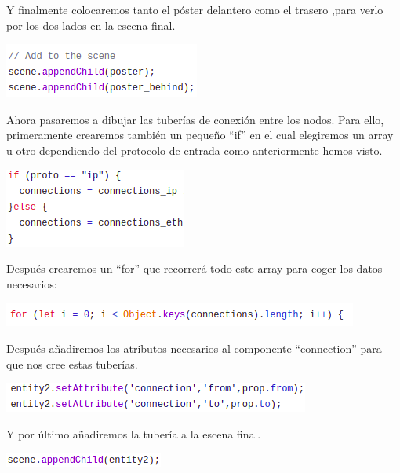 \documentclass[a4paper, 12pt]{book}
\begin{document}
Y finalmente colocaremos tanto el póster delantero como el trasero ,para verlo por los dos lados en la escena final.

\begin{center}
    \includegraphics[scale=0.7]{img/escenapost_comp_netsim.png}
\end{center}

Ahora pasaremos a dibujar las tuberías de conexión entre los nodos. Para ello, primeramente crearemos también un pequeño “if” en el cual elegiremos un array u otro dependiendo del protocolo de entrada como anteriormente hemos visto.

\begin{center}
    \includegraphics[scale=0.7]{img/ifINIconn_comp_netsim.png}
\end{center}

Después crearemos un “for” que recorrerá todo este array para coger los datos necesarios:

\begin{center}
    \includegraphics[scale=0.7]{img/forConne_comp_netsim.png}
\end{center}

Después añadiremos los atributos necesarios al componente “connection” para que nos cree estas tuberías.

\begin{center}
    \includegraphics[scale=0.7]{img/atribConn_comp_netsim.png}
\end{center}

Y por último añadiremos la tubería a la escena final.

\begin{center}
    \includegraphics[scale=0.7]{img/escenaConn_comp_netsim.png}
\end{center}
\end{document}
